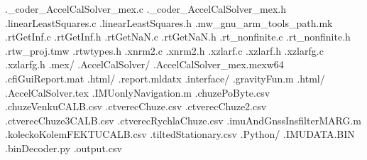\documentclass{article}
\begin{document}
{              ._coder_AccelCalSolver_mex.c
              ._coder_AccelCalSolver_mex.h
            .linearLeastSquares.c
            .linearLeastSquares.h
            .mw_gnu_arm_tools_path.mk
            .rtGetInf.c
            .rtGetInf.h
            .rtGetNaN.c
            .rtGetNaN.h
            .rt_nonfinite.c
            .rt_nonfinite.h
            .rtw_proj.tmw
            .rtwtypes.h
            .xnrm2.c
            .xnrm2.h
            .xzlarf.c
            .xzlarf.h
            .xzlarfg.c
            .xzlarfg.h
        .mex/
          .AccelCalSolver/
            .AccelCalSolver_mex.mexw64
            .cfiGuiReport.mat
            .html/
              .report.mldatx
            .interface/
      .gravityFun.m
      .html/
        .AccelCalSolver.tex
    .IMUonlyNavigation.m
    .chuzePoByte.csv
    .chuzeVenkuCALB.csv
    .ctverecChuze.csv
    .ctverecChuze2.csv
    .ctverecChuze3CALB.csv
    .ctverecRychlaChuze.csv
    .imuAndGnssInsfilterMARG.m
    .koleckoKolemFEKTUCALB.csv
    .tiltedStationary.csv
  .Python/
    .IMUDATA.BIN
    .binDecoder.py
    .output.csv

}
\end{document}
